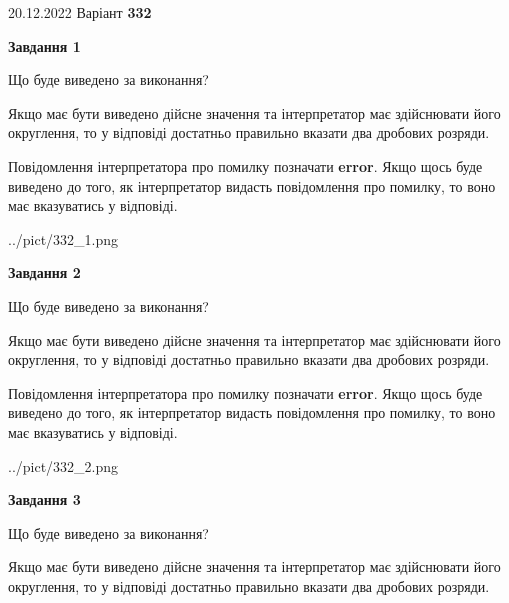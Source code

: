 \documentclass[12pt, ukrainian]{article}
\begin{document}
{20.12.2022 Варіант \No \textbf { 332 }\par}
{
\begin {Large}

{\begin {center}\textbf{Завдання 1}\end {center}}\par
Що буде виведено за виконання? \par

Якщо має бути виведено дійсне значення та інтерпретатор має здійснювати його округлення, 
то у відповіді достатньо правильно вказати два дробових розряди.

Повідомлення інтерпретатора про помилку позначати \textbf{error}.
Якщо щось буде виведено до того, як інтерпретатор видасть повідомлення про помилку, 
то воно має вказуватись у відповіді. \par

\begin{center}
	{../pict/332_1.png}
\end{center}
\newpage

{\begin {center}\textbf{Завдання 2}\end {center}}\par
Що буде виведено за виконання? \par

Якщо має бути виведено дійсне значення та інтерпретатор має здійснювати його округлення, 
то у відповіді достатньо правильно вказати два дробових розряди.

Повідомлення інтерпретатора про помилку позначати \textbf{error}.
Якщо щось буде виведено до того, як інтерпретатор видасть повідомлення про помилку, 
то воно має вказуватись у відповіді. \par

\begin{center}
	{../pict/332_2.png}
\end{center}
\newpage

{\begin {center}\textbf{Завдання 3}\end {center}}\par
Що буде виведено за виконання? \par

Якщо має бути виведено дійсне значення та інтерпретатор має здійснювати його округлення, 
то у відповіді достатньо правильно вказати два дробових розряди.


\end{Large}}
\end{document}
